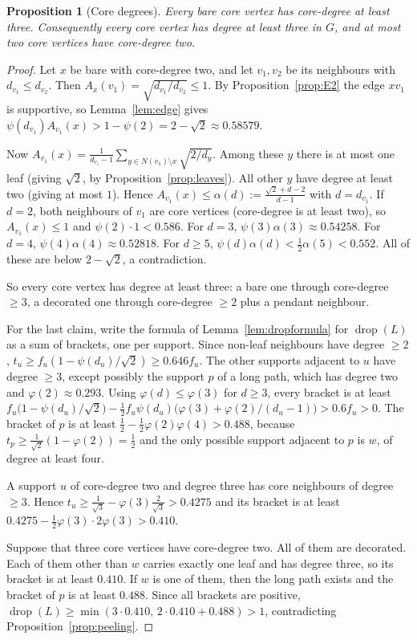 \documentclass[11pt,a4paper]{article}
\newtheorem{proposition}[theorem]{Proposition}
\theoremstyle{definition}
\newcommand{\drop}{\operatorname{drop}}
\begin{document}
\begin{proposition}[Core degrees]\label{prop:coredeg}
Every bare core vertex has core-degree at least three. Consequently every core vertex has degree at least three in $G$, and at most two core vertices have core-degree two.
\end{proposition}
\begin{proof}
Let $x$ be bare with core-degree two, and let $v_1,v_2$ be its neighbours with $d_{v_1}\le d_{v_2}$. Then $A_x(v_1)=\sqrt{d_{v_1}/d_{v_2}}\le1$. By Proposition~\ref{prop:E2} the edge $xv_1$ is supportive, so Lemma~\ref{lem:edge} gives $\psi(d_{v_1})A_{v_1}(x)>1-\psi(2)=2-\sqrt2\approx0.58579$.

Now $A_{v_1}(x)=\frac1{d_{v_1}-1}\sum_{y\in N(v_1)\setminus x}\sqrt{2/d_y}$. Among these $y$ there is at most one leaf (giving $\sqrt2$, by Proposition~\ref{prop:leaves}). All other $y$ have degree at least two (giving at most $1$). Hence $A_{v_1}(x)\le\alpha(d):=\frac{\sqrt2+d-2}{d-1}$ with $d=d_{v_1}$. If $d=2$, both neighbours of $v_1$ are core vertices (core-degree is at least two), so $A_{v_1}(x)\le1$ and $\psi(2)\cdot1<0.586$. For $d=3$, $\psi(3)\alpha(3)\approx0.54258$. For $d=4$, $\psi(4)\alpha(4)\approx0.52818$. For $d\ge5$, $\psi(d)\alpha(d)<\frac12\alpha(5)<0.552$. All of these are below $2-\sqrt2$, a contradiction.

So every core vertex has degree at least three: a bare one through core-degree $\ge3$, a decorated one through core-degree $\ge2$ plus a pendant neighbour.

For the last claim, write the formula of Lemma~\ref{lem:dropformula} for $\drop(L)$ as a sum of brackets, one per support. Since non-leaf neighbours have degree $\ge2$, $t_u\ge f_u(1-\psi(d_u)/\sqrt2)\ge0.646f_u$. The other supports adjacent to $u$ have degree $\ge3$, except possibly the support $p$ of a long path, which has degree two and $\varphi(2)\approx0.293$. Using $\varphi(d)\le\varphi(3)$ for $d\ge3$, every bracket is at least $f_u\bigl(1-\psi(d_u)/\sqrt2\bigr)-\frac12f_u\psi(d_u)\bigl(\varphi(3)+\varphi(2)/(d_u-1)\bigr)>0.6f_u>0$. The bracket of $p$ is at least $\frac12-\frac12\varphi(2)\varphi(4)>0.488$, because $t_p\ge\frac1{\sqrt2}(1-\varphi(2))=\frac12$ and the only possible support adjacent to $p$ is $w$, of degree at least four.

A support $u$ of core-degree two and degree three has core neighbours of degree $\ge3$. Hence $t_u\ge\frac1{\sqrt3}-\varphi(3)\frac2{\sqrt3}>0.4275$ and its bracket is at least $0.4275-\frac12\varphi(3)\cdot2\varphi(3)>0.410$.

Suppose that three core vertices have core-degree two. All of them are decorated. Each of them other than $w$ carries exactly one leaf and has degree three, so its bracket is at least $0.410$. If $w$ is one of them, then the long path exists and the bracket of $p$ is at least $0.488$. Since all brackets are positive, $\drop(L)\ge\min(3\cdot0.410,\,2\cdot0.410+0.488)>1$, contradicting Proposition~\ref{prop:peeling}.
\end{proof}
\end{document}
